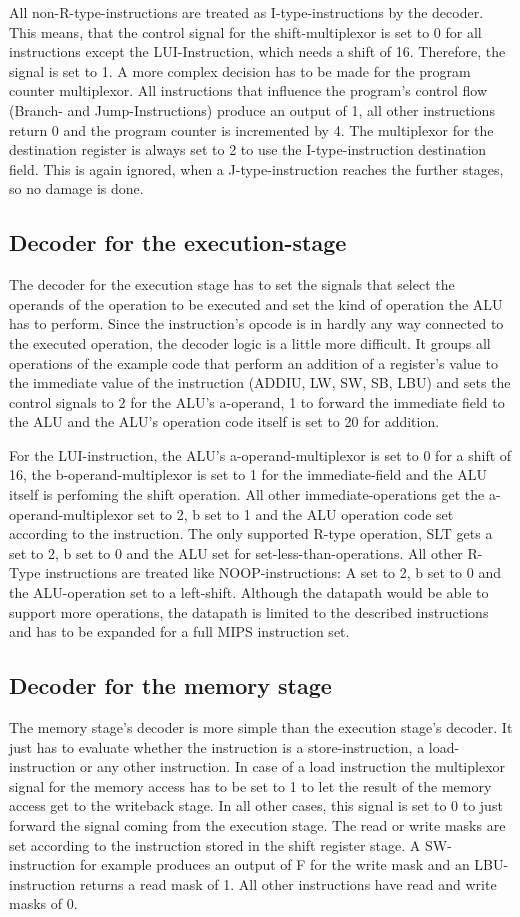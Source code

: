 All non-R-type-instructions are treated as I-type-instructions by the decoder. This means, that the control signal for the shift-multiplexor is set to 0 
for all instructions except the LUI-Instruction, which needs a shift of 16. Therefore, the signal is set to 1. A more complex decision has to be made for the program counter multiplexor. 
All instructions that influence the program's control flow (Branch- and Jump-Instructions) produce an output of 1, all other instructions return 0 and the program counter is incremented by 4. 
The multiplexor for the destination register is always set to 2 to use the I-type-instruction destination field. This is again ignored, when a J-type-instruction reaches the further stages, so no damage is done.
\subsection{Decoder for the execution-stage}
The decoder for the execution stage has to set the signals that select the operands of the operation to be executed and set the kind of operation the ALU has to perform. Since the instruction's opcode is in
hardly any way connected to the executed operation, the decoder logic is a little more difficult. It groups all operations of the example code that perform an addition of a register's value to the immediate 
value of the instruction (ADDIU, LW, SW, SB, LBU) and sets the control signals to 2 for the ALU's a-operand, 1 to forward the immediate field to the ALU and the ALU's operation code itself is set to 20
for addition. 

For the LUI-instruction, the ALU's a-operand-multiplexor is set to 0 for a shift of 16, the b-operand-multiplexor is set to 1 for the immediate-field and the ALU itself is perfoming the shift
operation. All other immediate-operations get the a-operand-multiplexor set to 2, b set to 1 and the ALU operation code set according to the instruction. The only supported R-type operation, SLT gets a set to 2,
b set to 0 and the ALU set for set-less-than-operations. All other R-Type instructions are treated like NOOP-instructions: A set to 2, b set to 0 and the ALU-operation set to a left-shift. 
Although the datapath would be able to support more operations, the datapath is limited to the described instructions and has to be expanded for a full MIPS instruction set.
\subsection{Decoder for the memory stage}
The memory stage's decoder is more simple than the execution stage's decoder. It just has to evaluate whether the instruction is a store-instruction,
a load-instruction or any other instruction. In case of a load instruction the multiplexor signal for the memory access has to be set to 1 to let the result of the memory access get to the writeback stage. 
In all other cases, this signal is set to 0 to just forward the signal coming from the execution stage. The read or write masks are set according to the instruction stored in the shift register stage.
A SW-instruction for example produces an output of F for the write mask and an LBU-instruction returns a read mask of 1. All other instructions have read and write masks of 0.

